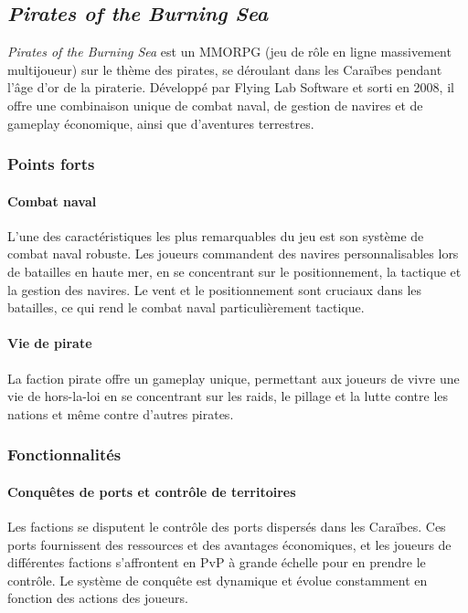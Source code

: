 \documentclass{article}
\begin{document}
\subsection{\textit{Pirates of the Burning Sea}}\hfill

\textit{Pirates of the Burning Sea} est un MMORPG (jeu de rôle en ligne massivement multijoueur) sur le thème des pirates, se déroulant dans les Caraïbes pendant l'âge d'or de la piraterie. Développé par Flying Lab Software et sorti en 2008, il offre une combinaison unique de combat naval, de gestion de navires et de gameplay économique, ainsi que d’aventures terrestres.

\subsubsection{Points forts}
\paragraph{Combat naval}\hfill

L'une des caractéristiques les plus remarquables du jeu est son système de combat naval robuste. Les joueurs commandent des navires personnalisables lors de batailles en haute mer, en se concentrant sur le positionnement, la tactique et la gestion des navires. Le vent et le positionnement sont cruciaux dans les batailles, ce qui rend le combat naval particulièrement tactique.

\paragraph{Vie de pirate}\hfill

La faction pirate offre un gameplay unique, permettant aux joueurs de vivre une vie de hors-la-loi en se concentrant sur les raids, le pillage et la lutte contre les nations et même contre d'autres pirates.



\subsubsection{Fonctionnalités}
\paragraph{Conquêtes de ports et contrôle de territoires}\hfill

Les factions se disputent le contrôle des ports dispersés dans les Caraïbes. Ces ports fournissent des ressources et des avantages économiques, et les joueurs de différentes factions s'affrontent en PvP à grande échelle pour en prendre le contrôle. Le système de conquête est dynamique et évolue constamment en fonction des actions des joueurs.
\end{document}
